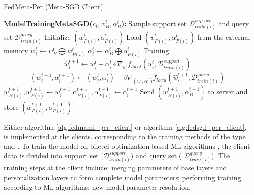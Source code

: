 \documentclass[runningheads]{llncs}
\begin{document}
\begin{algorithm}[h]
    \caption{FedMeta-Per (Meta-SGD Client)} \label{alg:fedsgd_per_client}
    \begin{algorithmic}[1]
        \State\textbf{ModelTrainingMetaSGD($c_i, w_B^t, \alpha_B^t$):}
        \State Sample support set $\mathcal{D}_{train(i)}^{support}$ and query set $\mathcal{D}_{train(i)}^{query}$
            \State Initialize $(w_{P(i)}^t, \alpha_{P(i)}^t)$
        \Else
            \State Load $(w_{P(i)}^t, \alpha_{P(i)}^t)$ from the external memory
        \EndIf
        \State $w_i^t \gets w_B^t \bigoplus w_{P(i)}^t$ 
        \State $\alpha_i^t \gets \alpha_B^t \bigoplus \alpha_{P(i)}^t$ 
        \State Training:
        \begin{dmath*}
            \hat{w}_{i}^{t+1} \gets w_{i}^t - \alpha_i^t\circ\nabla_{w_i^t} f_{local}\left(w_{i}^t, \mathcal{D}_{train(i)}^{support}\right)
        \end{dmath*}
        \begin{dmath*}
            (w_{i}^{t+1}, \alpha_i^{t+1}) \gets (w_{i}^t, \alpha_{i}^{t}) - \beta\nabla_{(w_i^t, \alpha_i^t)} f_{local}\left(\hat{w}_{i}^{t+1}, \mathcal{D}_{train(i)}^{query}\right)
        \end{dmath*}
        \State $w_{B(i)}^{t+1}, w_{P(i)}^{t+1} \gets w_i^{t+1}$ 
        \State $\alpha_{B(i)}^{t+1}, \alpha_{P(i)}^{t+1} \gets \alpha_i^{t+1}$ 
        \State Send $(w_{B(i)}^{t+1}, \alpha_B^{t+1})$ to server and store $(w_{P(i)}^{t+1}, \alpha_{P(i)}^{t+1})$
    \end{algorithmic}
\end{algorithm}

Either algorithm \ref{alg:fedmaml_per_client} or algorithm \ref{alg:fedsgd_per_client}, is implemented at the clients, corresponding to the training methods of the type  and . To train the model on bilevel optimization-based ML algorithms , the client data is divided into support set ($\mathcal{D}_{train(i)}^{support}$) and query set ( $\mathcal{D}_{train(i)}^{query}$). The training steps at the client include: merging parameters of base layers and personalization layers to form complete model parameters; performing training according to ML algorithms; new model parameter resolution.
\end{document}
